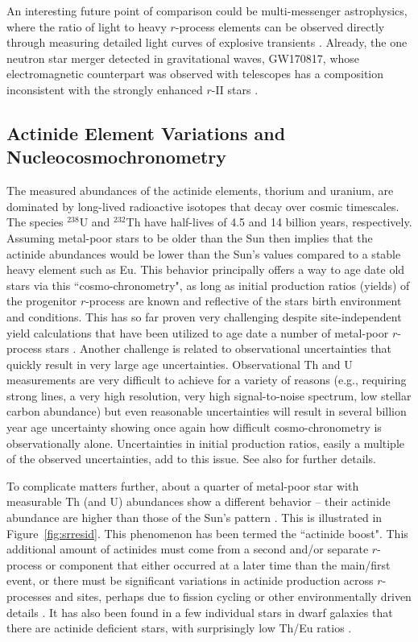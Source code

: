 \documentclass[letterpaper]{article}
\begin{document}
An interesting future point of comparison could be multi-messenger astrophysics, where the ratio of light to heavy $r$-process elements can be observed directly through measuring detailed light curves of explosive transients \citep{kilpatrick17,Chornock2017,Tanaka2017,Tanvir2017}. Already, the one neutron star merger detected in gravitational waves, GW170817, whose electromagnetic counterpart was observed with telescopes has a composition inconsistent with the strongly enhanced $r$-II stars \citep{Ji2019b}.


\subsection{Actinide Element Variations and Nucleocosmochronometry}

The measured abundances of the actinide elements, thorium and uranium, are dominated by long-lived radioactive isotopes that decay over cosmic timescales. The species $^{238}$U and $^{232}$Th have half-lives of 4.5 and 14 billion years, respectively. Assuming metal-poor stars to be older than the Sun then implies that the actinide abundances would be lower than the Sun's values compared to a stable heavy element such as Eu. This behavior principally offers a way to age date old stars via this ``cosmo-chronometry", as long as initial production ratios (yields) of the progenitor $r$-process are known and reflective of the stars birth environment and conditions. This has so far proven very challenging despite site-independent yield calculations \citep{schatz02, hill17} that have been utilized to age date a number of metal-poor $r$-process stars \citep{Cayrel01,he1523,placco17}. Another challenge is related to observational uncertainties that quickly result in very large age uncertainties. Observational Th and U measurements are very difficult to achieve for a variety of reasons (e.g., requiring strong lines, a very high resolution, very high signal-to-noise spectrum, low stellar carbon abundance) but even reasonable uncertainties will result in several billion year age uncertainty showing once again how difficult cosmo-chronometry is observationally alone. Uncertainties in initial production ratios, easily a multiple of the observed uncertainties, add to this issue. See also \citet{Frebel2018} for further details.

To complicate matters further, about a quarter of metal-poor star with measurable Th (and U) abundances show a different behavior -- their actinide abundance are higher than those of the Sun's pattern \citep{holmbeck18}. This is illustrated in Figure~\ref{fig:srresid}. This phenomenon has been termed the ``actinide boost". This additional amount of actinides must come from a second and/or separate $r$-process or component that either occurred at a later time than the main/first event, or there must be significant variations in actinide production across $r$-processes and sites, perhaps due to fission cycling or other environmentally driven details \citep{holmbeck2019}.
It has also been found in a few individual stars in dwarf galaxies that there are  actinide deficient stars, with surprisingly low Th/Eu ratios \citep{Ji2018,Hansen2021}.
\end{document}

